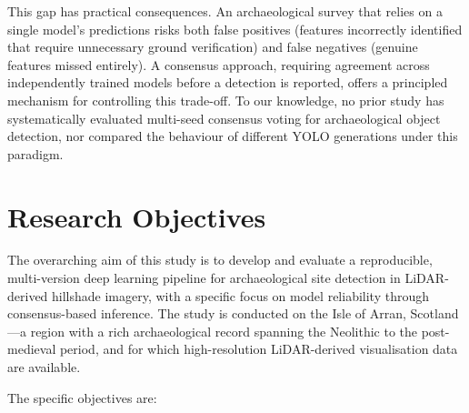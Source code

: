 \documentclass[12pt,a4paper]{article}
\begin{document}
This gap has practical consequences. An archaeological survey that relies on a single
model's predictions risks both false positives (features incorrectly identified that
require unnecessary ground verification) and false negatives (genuine features missed
entirely). A consensus approach, requiring agreement across independently trained models
before a detection is reported, offers a principled mechanism for controlling this
trade-off. To our knowledge, no prior study has systematically evaluated multi-seed
consensus voting for archaeological object detection, nor compared the behaviour of
different YOLO generations under this paradigm.

\section{Research Objectives}

The overarching aim of this study is to develop and evaluate a reproducible, multi-version
deep learning pipeline for archaeological site detection in LiDAR-derived hillshade
imagery, with a specific focus on model reliability through consensus-based inference.
The study is conducted on the Isle of Arran, Scotland---a region with a rich archaeological
record spanning the Neolithic to the post-medieval period, and for which high-resolution
LiDAR-derived visualisation data are available.

The specific objectives are:
\end{document}
